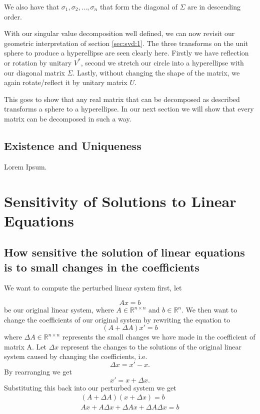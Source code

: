 \documentclass[12pt,reqno,twoside,titlepage]{article}
\theoremstyle{definition}
\begin{document}
We also have that $\sigma_1, \sigma_2, \dots, \sigma_n$ that form the diagonal of $\Sigma$ are in descending order.

With our singular value decomposition well defined, we can now revisit our geometric interpretation of section \ref{sec:svd:1}. The three transforms on the unit sphere to produce a hyperellipse are seen clearly here. Firstly we have reflection or rotation by unitary $V^*$, second we stretch our circle into a hyperellipse with our diagonal matrix $\Sigma$. Lastly, without changing the shape of the matrix, we again rotate/reflect it by unitary matrix $U$.

This goes to show that any real matrix that can be decomposed as described transforms a sphere to a hyperellipse. In our next section we will show that every matrix can be decomposed in such a way.
\subsection{Existence and Uniqueness}
\label{sec:svd:3}

Lorem Ipsum.

\section{Sensitivity of Solutions to Linear Equations}
\label{sec:ssl}
\subsection{How sensitive the solution of linear equations is to small changes in the coefficients }
We want to compute the perturbed linear system first, let

$$Ax=b$$
be our original linear system, where $A\in\mathbb{R}^{n\times n}$ and $b\in\mathbb{R}^n$.
\newline
We then want to change the coefficients of our original system by rewriting the equation to
$$(A+\Delta A)x'=b$$
where $\Delta A\in \mathbb{R}^{n\times n}$ represents the small changes we have made in the coefficient of matrix A.
\newline
Let $\Delta x$ represent the changes to the solutions of the original linear system caused by changing the coefficients, i.e. 
$$\Delta x=x'-x.$$
\newline 
By rearranging we get
$$x'=x+\Delta x.$$
Substituting this back into our perturbed system we get
\begin{align*}
(A+\Delta A)(x+\Delta x)= b\\
Ax+A\Delta x+\Delta A x+\Delta A\Delta x=b
\end{align*}
\end{document}
